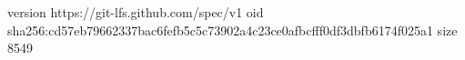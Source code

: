 version https://git-lfs.github.com/spec/v1
oid sha256:cd57eb79662337bac6fefb5c5c73902a4c23ce0afbcfff0df3dbfb6174f025a1
size 8549
